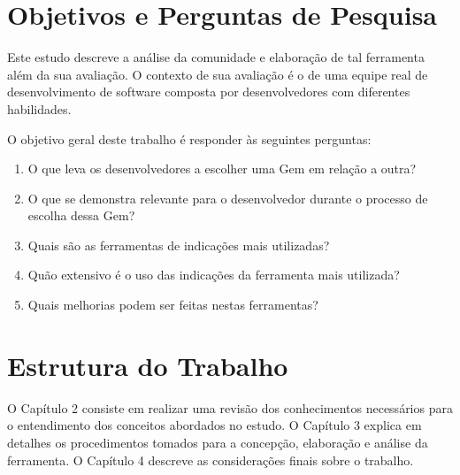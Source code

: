 \section{Objetivos e Perguntas de Pesquisa}

Este estudo descreve a análise da comunidade e elaboração de tal ferramenta além da sua avaliação. O contexto de sua avaliação é o de uma equipe real de desenvolvimento de software composta por desenvolvedores com diferentes habilidades.

O objetivo geral deste trabalho é responder às seguintes perguntas:

\begin{enumerate}
  \item O que leva os desenvolvedores a escolher uma Gem em relação a outra?
  \item O que se demonstra relevante para o desenvolvedor durante o processo de escolha dessa Gem?
  \item Quais são as ferramentas de indicações mais utilizadas?
  \item Quão extensivo é o uso das indicações da ferramenta mais utilizada?
  \item Quais melhorias podem ser feitas nestas ferramentas?
\end{enumerate}

\section{Estrutura do Trabalho}

O Capítulo 2 consiste em realizar uma revisão dos conhecimentos necessários para o entendimento dos conceitos abordados no estudo. O Capítulo 3 explica em detalhes os procedimentos tomados para a concepção, elaboração e análise da ferramenta. O Capítulo 4 descreve as considerações finais sobre o trabalho.
